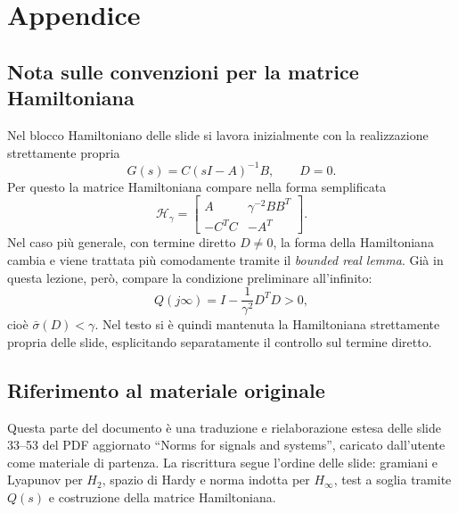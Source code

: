 \documentclass[11pt,a4paper]{article}
\begin{document}
\clearpage
{}
\section*{Appendice}

\subsection*{Nota sulle convenzioni per la matrice Hamiltoniana}
{}

Nel blocco Hamiltoniano delle slide si lavora inizialmente con la realizzazione strettamente propria
$$
G(s)=C(sI-A)^{-1}B,
\qquad D=0.
$$
Per questo la matrice Hamiltoniana compare nella forma semplificata
$$
\mathcal{H}_\gamma
=
\begin{bmatrix}
A & \gamma^{-2}BB^T\\
-C^TC & -A^T
\end{bmatrix}.
$$
Nel caso pi\`u generale, con termine diretto $D\neq 0$, la forma della Hamiltoniana cambia e viene trattata pi\`u comodamente tramite il \emph{bounded real lemma}. Gi\`a in questa lezione, per\`o, compare la condizione preliminare all'infinito:
$$
Q(j\infty)=I-\frac{1}{\gamma^2}D^TD>0,
$$
cio\`e $\bar{\sigma}(D)<\gamma$. Nel testo si \`e quindi mantenuta la Hamiltoniana strettamente propria delle slide, esplicitando separatamente il controllo sul termine diretto.

\subsection*{Riferimento al materiale originale}
{}

Questa parte del documento \`e una traduzione e rielaborazione estesa delle slide 33--53 del PDF aggiornato ``Norms for signals and systems'', caricato dall'utente come materiale di partenza. La riscrittura segue l'ordine delle slide: gramiani e Lyapunov per $H_2$, spazio di Hardy e norma indotta per $H_\infty$, test a soglia tramite $Q(s)$ e costruzione della matrice Hamiltoniana.
\end{document}
